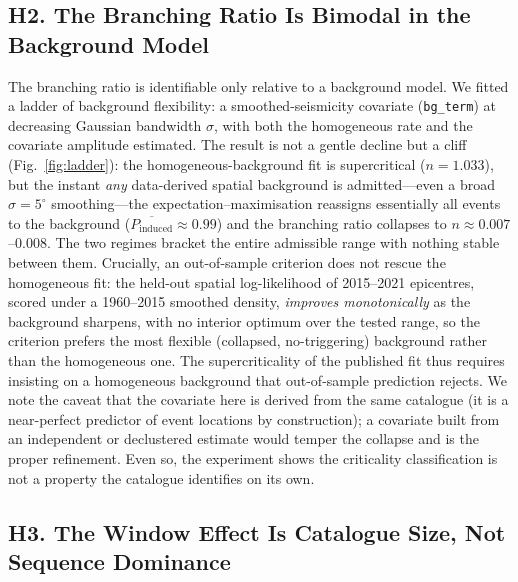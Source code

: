 \subsection*{H2. The Branching Ratio Is Bimodal in the Background Model}

The branching ratio is identifiable only relative to a background model. We fitted
a ladder of background flexibility: a smoothed-seismicity covariate
(\texttt{bg\_term}) at decreasing Gaussian bandwidth $\sigma$, with both the
homogeneous rate and the covariate amplitude estimated. The result is not a gentle
decline but a cliff (Fig.~\ref{fig:ladder}): the homogeneous-background fit is
supercritical ($n=1.033$), but the instant \emph{any} data-derived spatial
background is admitted---even a broad $\sigma=5^\circ$ smoothing---the
expectation--maximisation reassigns essentially all events to the background
($\overline{P_{\mathrm{induced}}}\approx0.99$) and the branching ratio collapses to
$n\approx0.007$--$0.008$. The two regimes bracket the entire admissible range with
nothing stable between them. Crucially, an out-of-sample criterion does not rescue
the homogeneous fit: the held-out spatial log-likelihood of 2015--2021 epicentres,
scored under a 1960--2015 smoothed density, \emph{improves monotonically} as the
background sharpens, with no interior optimum over the tested range, so the
criterion prefers the most flexible (collapsed, no-triggering) background rather
than the homogeneous one. The supercriticality of the published fit thus requires
insisting on a homogeneous background that out-of-sample prediction rejects. We
note the caveat that the covariate here is derived from the same catalogue (it is
a near-perfect predictor of event locations by construction); a covariate built
from an independent or declustered estimate would temper the collapse and is the
proper refinement. Even so, the experiment shows the criticality classification is
not a property the catalogue identifies on its own.

\subsection*{H3. The Window Effect Is Catalogue Size, Not Sequence Dominance}

